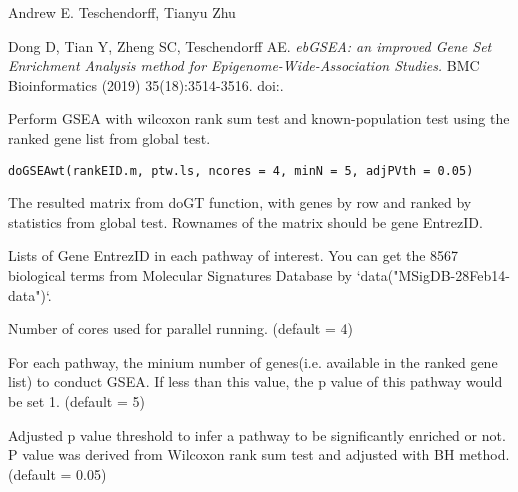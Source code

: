 \documentclass[letterpaper]{book}
\begin{document}
%
\begin{Author}\relax
Andrew E. Teschendorff, Tianyu Zhu
\end{Author}
%
\begin{References}\relax
Dong D, Tian Y, Zheng SC, Teschendorff AE.
\emph{ebGSEA: an improved Gene Set Enrichment Analysis method for Epigenome-Wide-Association Studies.}
BMC Bioinformatics (2019) 35(18):3514-3516.
doi:.
\end{References}
%
\begin{Examples}
\end{Examples}
%
\begin{Description}\relax
Perform GSEA with wilcoxon rank sum test and known-population test using the ranked gene list from global test.
\end{Description}
%
\begin{Usage}
\begin{verbatim}
doGSEAwt(rankEID.m, ptw.ls, ncores = 4, minN = 5, adjPVth = 0.05)
\end{verbatim}
\end{Usage}
%
\begin{Arguments}
\begin{ldescription}
\item[\code{rankEID.m}] The resulted matrix from doGT function, with genes by row and ranked by statistics from global test. Rownames of the matrix should be gene EntrezID.

\item[\code{ptw.ls}] Lists of Gene EntrezID in each pathway of interest. You can get the 8567 biological terms from Molecular Signatures Database by `data("MSigDB-28Feb14-data")`.

\item[\code{ncores}] Number of cores used for parallel running. (default = 4)

\item[\code{minN}] For each pathway, the minium number of genes(i.e. available in the ranked gene list) to conduct GSEA. If less than this value, the p value of this pathway would be set 1. (default = 5)

\item[\code{adjPVth}] Adjusted p value threshold to infer a pathway to be significantly enriched or not. P value was derived from Wilcoxon rank sum test and adjusted with BH method. (default = 0.05)
\end{ldescription}
\end{Arguments}
\end{document}
